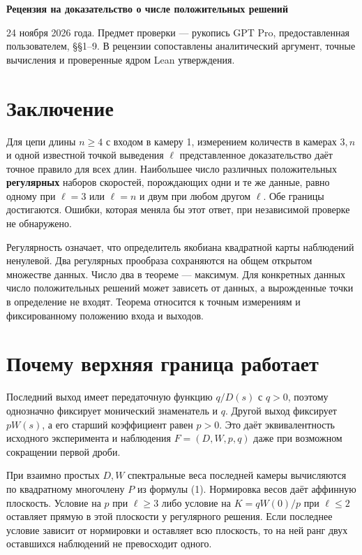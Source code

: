 \documentclass[12pt,a4paper]{article}
\begin{document}
\begin{center}{\Large\bfseries\color{ink} Рецензия на доказательство о числе положительных решений\par}\end{center}

24 ноября 2026 года. Предмет проверки — рукопись GPT Pro, предоставленная пользователем, §§1–9. В рецензии сопоставлены аналитический аргумент, точные вычисления и проверенные ядром Lean утверждения.

\section*{\color{ink} Заключение}

Для цепи длины \(n\ge4\) с входом в камеру 1, измерением количеств в камерах \(3,n\) и одной известной точкой выведения \(\ell\) представленное доказательство даёт точное правило для всех длин. Наибольшее число различных положительных \textbf{регулярных} наборов скоростей, порождающих одни и те же данные, равно одному при \(\ell=3\) или \(\ell=n\) и двум при любом другом \(\ell\). Обе границы достигаются. Ошибки, которая меняла бы этот ответ, при независимой проверке не обнаружено.

Регулярность означает, что определитель якобиана квадратной карты наблюдений ненулевой. Два регулярных прообраза сохраняются на общем открытом множестве данных. Число два в теореме — максимум. Для конкретных данных число положительных решений может зависеть от данных, а вырожденные точки в определение не входят. Теорема относится к точным измерениям и фиксированному положению входа и выходов.

\section*{\color{ink} Почему верхняя граница работает}

Последний выход имеет передаточную функцию \(q/D(s)\) с \(q>0\), поэтому однозначно фиксирует монический знаменатель и \(q\). Другой выход фиксирует \(pW(s)\), а его старший коэффициент равен \(p>0\). Это даёт эквивалентность исходного эксперимента и наблюдения \(F=(D,W,p,q)\) даже при возможном сокращении первой дроби.

При взаимно простых \(D,W\) спектральные веса последней камеры вычисляются по квадратному многочлену \(P\) из формулы (1). Нормировка весов даёт аффинную плоскость. Условие на \(p\) при \(\ell\ge3\) либо условие на \(K=qW(0)/p\) при \(\ell\le2\) оставляет прямую в этой плоскости у регулярного решения. Если последнее условие зависит от нормировки и оставляет всю плоскость, то на ней ранг двух оставшихся наблюдений не превосходит одного.
\end{document}
